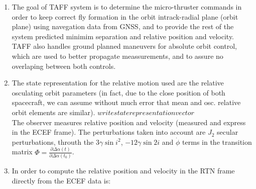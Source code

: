 \documentclass[a4paper]{article}
\begin{document}
\begin{enumerate}[label=\emph{\alph*)}]
  \item The goal of TAFF system is to determine the micro-thruster commands in order to keep correct fly formation in the orbit intrack-radial plane (orbit plane) using navegation data from GNSS, and to provide the rest of the system predicted minimim separation and relative position and velocity. TAFF also handles ground planned maneuvers for absolute orbit control, which are used to better propagate meassurements, and to assure no overlaping between both controls.
  \item The state representation for the relative motion used are the relative osculating orbit parameters (in fact, due to the close position of both spacecraft, we can assume without much error that mean and osc. relative orbit elements are similar).
    $write state representation vector$\\
    The observer measures relative position and velocity (measured and express in the ECEF frame). The perturbations taken into account are $J_2$ secular perturbations, throuth the $3\gamma\sin{i}^2$, $-12\gamma \sin{2i}$ and $\dot{\phi}$ terms in the transition matrix $\Phi=\frac{\partial \Delta \alpha (t)}{\partial \Delta \alpha (t_0)}$.

  \item In order to compute the relative position and velocity in the RTN frame directly from the ECEF data is:
\end{enumerate}
\end{document}
